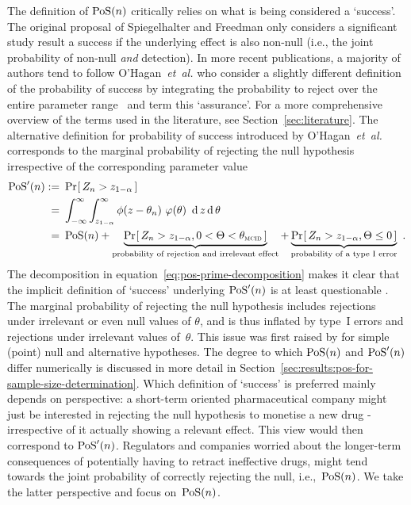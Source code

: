 \documentclass{article}
\renewcommand{\Pr}{\operatorname{Pr}}
\begin{document}
The definition of $\operatorname{PoS}(n)$ critically relies on what is being considered a `success'.
The original proposal of Spiegelhalter and Freedman only considers a significant study result a success if the underlying effect is also non-null (i.e., the joint probability of non-null \emph{and} detection).
In more recent publications, a majority of authors tend to follow
O'Hagan~\textit{et~al.} who consider a slightly
different definition of the probability of success by integrating the probability to reject over the entire parameter range~\citep{o2001bayesian,ohagan-2005}
and term this `assurance'.
For a more comprehensive overview of the terms used in
the literature, see Section~\ref{sec:literature}.
The alternative definition for probability of success introduced by O'Hagan~\textit{et~al.}
corresponds to the marginal probability of rejecting the null hypothesis irrespective of the corresponding parameter value
\begin{align}
    \PoS'(n) :=&\ \Pr_{}[\,Z_n > \criticalvalue\,]  \\
           =&\ \int_{-\infty}^\infty \int_{\criticalvalue}^\infty \phi(z - \theta_n)\ \varphi(\theta)\ \operatorname{d}z\operatorname{d}\theta\\
           =&\ \PoS(n) + \underbrace{\Pr_{}[\,Z_n > \criticalvalue, 0<\Theta<\mcid\,]}_{\text{probability of rejection and irrelevant effect}} + \underbrace{\Pr_{}[\,Z_n > \criticalvalue, \Theta \leq 0\,]}_{\text{probability of a type~I error}} \ .
           \label{eq:pos-prime-decomposition}
\end{align}
The decomposition in equation~\eqref{eq:pos-prime-decomposition} makes it clear that the implicit definition of `success' underlying $\operatorname{PoS}'(n)$ is at least questionable \citep{liu-2010}.
The marginal probability of rejecting the null hypothesis includes rejections under irrelevant or even null values of $\theta$, and is thus inflated by type~I errors and rejections under irrelevant values of~$\theta$.
This issue was first raised by \citet{spiegelhalter-2004}
for simple (point) null and alternative hypotheses.
The degree to which $\operatorname{PoS}(n)$ and $\operatorname{PoS}'(n)$ differ numerically is discussed in more detail in Section~\ref{sec:results:pos-for-sample-size-determination}.
Which definition of `success' is preferred mainly depends on perspective: a short-term oriented pharmaceutical company might just be interested in rejecting the null hypothesis to monetise a new drug - irrespective of it actually showing a relevant effect. This view would then correspond to $\operatorname{PoS}'(n)$.
Regulators and companies worried about the longer-term consequences of potentially having to retract ineffective drugs,
might tend towards the joint probability of correctly rejecting the null, i.e.,~$\operatorname{PoS}(n)$.
We take the latter perspective and focus on~$\operatorname{PoS}(n)$.
\end{document}
